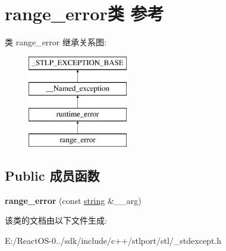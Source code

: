 \hypertarget{classrange__error}{}\section{range\+\_\+error类 参考}
\label{classrange__error}
类 range\+\_\+error 继承关系图\+:\begin{figure}[H]
\begin{center}
\leavevmode
\includegraphics[height=4.000000cm]{classrange__error}
\end{center}
\end{figure}
\subsection*{Public 成员函数}
\begin{DoxyCompactItemize}
\item 
\mbox{\label{classrange__error_a1f3f4177e57c24d5fef52464925c9457}} 
{\bfseries range\+\_\+error} (const \hyperlink{structstring}{string} \&\+\_\+\+\_\+arg)
\end{DoxyCompactItemize}


该类的文档由以下文件生成\+:\begin{DoxyCompactItemize}
\item 
E\+:/\+React\+O\+S-\/0../sdk/include/c++/stlport/stl/\+\_\+stdexcept.\+h\end{DoxyCompactItemize}

